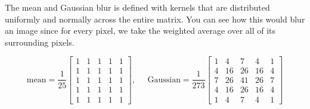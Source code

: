 \documentclass{article}
\begin{document}
    \begin{example}
    The mean and Gaussian blur is defined with kernels that are distributed uniformly and normally across the entire matrix. You can see how this would blur an image since for every pixel, we take the weighted average over all of its surrounding pixels. 

    \[\text{mean} = \frac{1}{25} \begin{bmatrix} 1 & 1 & 1 & 1 & 1 \\ 1 & 1 & 1 & 1 & 1 \\ 1 & 1 & 1 & 1 & 1 \\ 1 & 1 & 1 & 1 & 1 \\ 1 & 1 & 1 & 1 & 1 \end{bmatrix}, \;\;\;\;\; \text{Gaussian} = \frac{1}{273} \begin{bmatrix} 1 & 4 & 7 & 4 & 1 \\ 4 & 16 & 26 & 16 & 4 \\ 7 & 26 & 41 & 26 & 7 \\ 4 & 16 & 26 & 16 & 4 \\ 1 & 4 & 7 & 4 & 1 \end{bmatrix}\]


\end{example}
\end{document}
